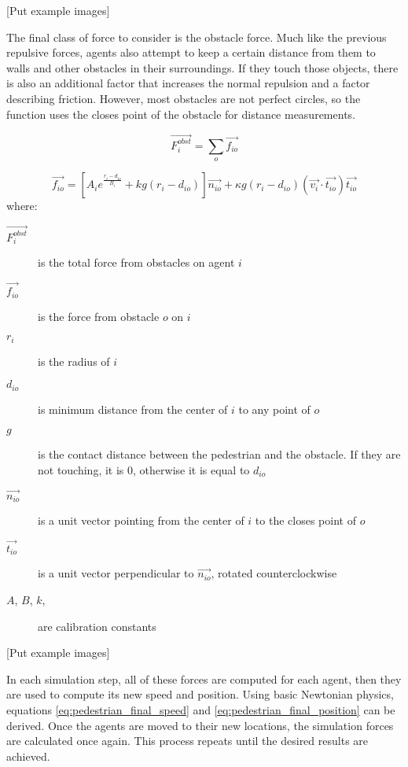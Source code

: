 \documentclass[twoside, 11pt]{article}
\begin{document}
[Put example images]

The final class of force to consider is the obstacle force. Much like the previous repulsive forces, agents also attempt to keep a certain distance from them to walls and other obstacles in their surroundings. If they touch those objects, there is also an additional factor that increases the normal repulsion and a factor describing friction. However, most obstacles are not perfect circles, so the function uses the closes point of the obstacle for distance measurements.

\begin{equation}
  \vec{F_i^{obst}} = \sum_o\vec{f_{io}}
  \label{eq:pedestrian_obstacle_total}
\end{equation}

\begin{equation}
  \vec{f_{io}} = [A_ie^{\frac{r_i - d_{io}}{B_i}} + kg(r_i-d_{io})]\vec{n_{io}} + \kappa g (r_i - d_{io})(\vec{v_i} \cdot \vec{t_{io}})\vec{t_{io}}
  \label{eq:pedestrian_obstacle}
\end{equation}
where:
\begin{description}
  \item[$\vec{F_i^{obst}}$] is the total force from obstacles on agent $i$
  \item[$\vec{f_{io}}$] is the force from obstacle $o$ on $i$
  \item[$r_i$] is the radius of $i$
  \item[$d_{io}$] is minimum distance from the center of $i$ to any point of $o$
  \item[$g$] is the contact distance between the pedestrian and the obstacle. If they are not touching, it is $0$, otherwise it is equal to $d_{io}$
  \item[$\vec{n_{io}}$] is a unit vector pointing from the center of $i$ to the closes point of $o$
  \item[$\vec{t_{io}}$] is a unit vector perpendicular to $\vec{n_{io}}$, rotated counterclockwise
  \item[$A$, $B$, $k$, \kappa] are calibration constants
\end{description}


[Put example images]

In each simulation step, all of these forces are computed for each agent, then they are used to compute its new speed and position. Using basic Newtonian physics, equations \eqref{eq:pedestrian_final_speed} and \eqref{eq:pedestrian_final_position} can be derived. Once the agents are moved to their new locations, the simulation forces are calculated once again. This process repeats until the desired results are achieved.
\end{document}

